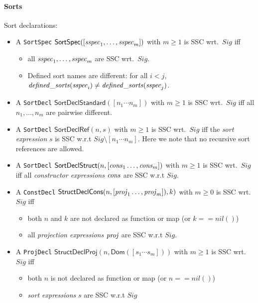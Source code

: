 \documentclass[fleqn,a4paper,dvips]{article}
\newcommand{\aterm}[1]{\mathsf{#1}}
\begin{document}
\paragraph{Sorts}
Sort declarations:
\begin{itemize}
\item
  A {\tt SortSpec}
  $\aterm{SortSpec}([\nm{sspec}_1,\dots,\nm{sspec}_m])$ with $m\geq 1$
  is SSC wrt.\ $Sig$ iff 
  \begin{itemize}
  \item all $\mathit{sspec}_1,\dots,\mathit{sspec}_m$ are SSC wrt.\ $Sig$.
  \item Defined sort names are different: for all $i<j$, $\mathit{defined\_sorts}(\mathit{sspec}_i)\neq\mathit{defined\_sorts}(\mathit{sspec}_j)$.
  \end{itemize}
\item 
  A {\tt SortDecl}
  $\aterm{SortDeclStandard}([n_1\cdots n_m])$ with $m\geq 1$
  is SSC wrt.\ $Sig$ iff all $n_1,\ldots,n_m$ are pairwise
  different.
\item
  A {\tt SortDecl}
  $\aterm{SortDeclRef}(n,s)$ with $m\geq 1$
  is SSC wrt.\ $Sig$ iff the \emph{sort expression} $s$ is SSC w.r.t $Sig\setminus [n_1\cdots n_m]$.
  Here we note that no recursive sort references are allowed.
\item
  A {\tt SortDecl}
  $\aterm{SortDeclStruct}(n,[\nm{cons}_1\dots,\nm{cons}_m])$ with $m\geq 1$
  is SSC wrt.\ $Sig$ iff all \emph{constructor expressions} $\mathit{cons}$ are SSC w.r.t $Sig$.
\item 
  A {\tt ConstDecl}
  $\aterm{StructDeclCons}(n,[\nm{proj}_1\dots,\nm{proj}_m]),k)$ with $m\geq 0$
  is SSC wrt.\ $Sig$ iff 
  \begin{itemize}
  \item both $n$ and $k$ are not declared as function or map (or $k==nil()$)
  \item all \emph{projection expressions} $\mathit{proj}$ are SSC w.r.t $Sig$.
  \end{itemize}
\item 
  A {\tt ProjDecl}
  $\aterm{StructDeclProj}(n,\aterm{Dom}([s_1\cdots s_m]))$ with $m\geq 1$
  is SSC wrt.\ $Sig$ iff 
  \begin{itemize}
  \item both $n$ is not declared as function or map (or $n==nil()$)
  \item \emph{sort expressions} $s$ are SSC w.r.t $Sig$
  \end{itemize}
\end{itemize}
\end{document}
